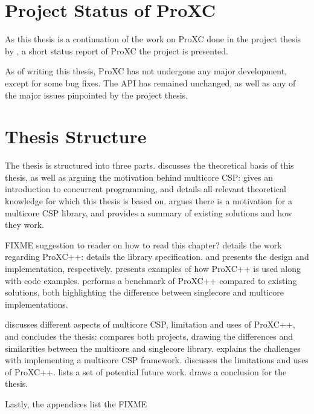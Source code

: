 \section{Project Status of ProXC}

As this thesis is a continuation of the work on ProXC done in the project thesis by \citet{pettersen2016proxc}, a short status report of ProXC the project is presented.

As of writing this thesis, ProXC has not undergone any major development, except for some bug fixes. The API has remained unchanged, as well as any of the major issues pinpointed by the project thesis. 


\section{Thesis Structure}


The thesis is structured into three parts.  discusses the theoretical basis of this thesis, as well as arguing the motivation behind multicore CSP:  gives an introduction to concurrent programming, and details all relevant theoretical knowledge for which this thesis is based on.  argues there is a motivation for a multicore CSP library, and provides a summary of existing solutions and how they work. 

FIXME suggestion to reader on how to read this chapter?
 details the work regarding ProXC++:  details the library specification.  and  presents the design and implementation, respectively.  presents examples of how ProXC++ is used along with code examples.  performs a benchmark of ProXC++ compared to existing solutions, both highlighting the difference between singlecore and multicore implementations.

 discusses different aspects of multicore CSP, limitation and uses of ProXC++, and concludes the thesis:  compares both projects, drawing the differences and similarities between the multicore and singlecore library.  explains the challenges with implementing a multicore CSP framework.  discusses the limitations and uses of ProXC++.  lists a set of potential future work.  draws a conclusion for the thesis.


Lastly, the appendices list the FIXME
